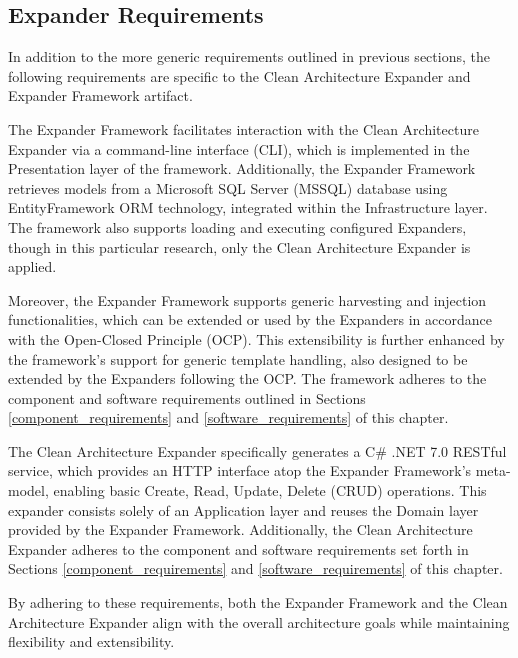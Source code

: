 \subsection{Expander Requirements} \label{expander_framework_requirements}

In addition to the more generic requirements outlined in previous sections, the following
requirements are specific to the Clean Architecture Expander and Expander Framework
artifact.

The Expander Framework facilitates interaction with the Clean Architecture Expander via a
command-line interface (CLI), which is implemented in the Presentation layer of the
framework. Additionally, the Expander Framework retrieves models from a Microsoft SQL
Server (MSSQL) database using EntityFramework ORM technology, integrated within the
Infrastructure layer. The framework also supports loading and executing configured
Expanders, though in this particular research, only the Clean Architecture Expander is
applied.

Moreover, the Expander Framework supports generic harvesting and injection
functionalities, which can be extended or used by the Expanders in accordance with the
Open-Closed Principle (OCP). This extensibility is further enhanced by the framework's
support for generic template handling, also designed to be extended by the Expanders
following the OCP. The framework adheres to the component and software requirements
outlined in Sections \ref{component_requirements} and \ref{software_requirements} of this
chapter.

The Clean Architecture Expander specifically generates a C\# .NET 7.0 RESTful service,
which provides an HTTP interface atop the Expander Framework’s meta-model, enabling basic
Create, Read, Update, Delete (CRUD) operations. This expander consists solely of an
Application layer and reuses the Domain layer provided by the Expander Framework.
Additionally, the Clean Architecture Expander adheres to the component and software
requirements set forth in Sections \ref{component_requirements} and
\ref{software_requirements} of this chapter.

By adhering to these requirements, both the Expander Framework and the Clean Architecture
Expander align with the overall architecture goals while maintaining flexibility and
extensibility.
